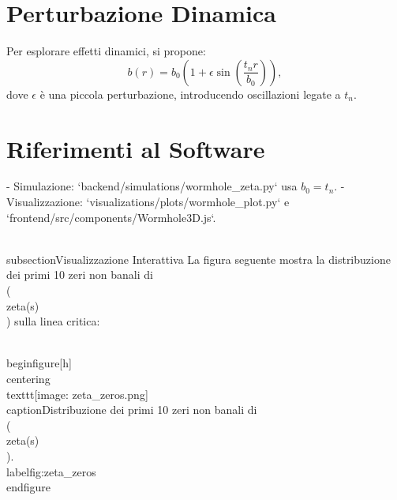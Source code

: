 \documentclass[11pt]{article}
\begin{document}
\section{Perturbazione Dinamica}
Per esplorare effetti dinamici, si propone:
\begin{equation}
b(r) = b_0 \left( 1 + \epsilon \sin\left( \frac{t_n r}{b_0} \right) \right),
\label{eq:dynamic}
\end{equation}
dove \( \epsilon \) è una piccola perturbazione, introducendo oscillazioni legate a \( t_n \).

\section{Riferimenti al Software}
- Simulazione: `backend/simulations/wormhole_zeta.py` usa \( b_0 = t_n \).
- Visualizzazione: `visualizations/plots/wormhole_plot.py` e `frontend/src/components/Wormhole3D.js`.

\\subsection{Visualizzazione Interattiva}
La figura seguente mostra la distribuzione dei primi 10 zeri non banali di \\( \\zeta(s) \\) sulla linea critica:

\\begin{figure}[h]
\\centering
\\texttt{[image: zeta\_zeros.png]}
\\caption{Distribuzione dei primi 10 zeri non banali di \\( \\zeta(s) \\).}
\\label{fig:zeta_zeros}
\\end{figure}

\
\end{document}
